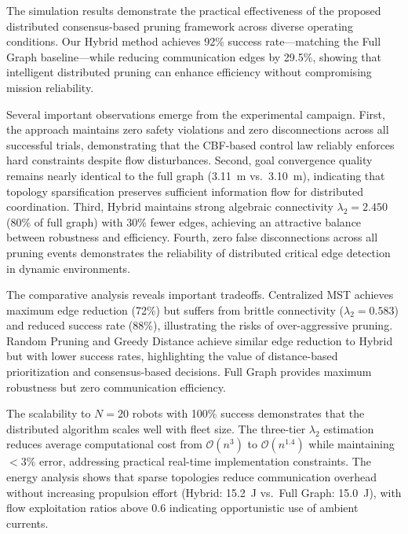 The simulation results demonstrate the practical effectiveness of the proposed distributed consensus-based pruning framework across diverse operating conditions. Our Hybrid method achieves 92\% success rate---matching the Full Graph baseline---while reducing communication edges by 29.5\%, showing that intelligent distributed pruning can enhance efficiency without compromising mission reliability.

Several important observations emerge from the experimental campaign. First, the approach maintains zero safety violations and zero disconnections across all successful trials, demonstrating that the CBF-based control law reliably enforces hard constraints despite flow disturbances. Second, goal convergence quality remains nearly identical to the full graph (3.11~m vs.\ 3.10~m), indicating that topology sparsification preserves sufficient information flow for distributed coordination. Third, Hybrid maintains strong algebraic connectivity $\lambda_2 = 2.450$ (80\% of full graph) with 30\% fewer edges, achieving an attractive balance between robustness and efficiency. Fourth, zero false disconnections across all pruning events demonstrates the reliability of distributed critical edge detection in dynamic environments.

The comparative analysis reveals important tradeoffs. Centralized MST achieves maximum edge reduction (72\%) but suffers from brittle connectivity ($\lambda_2 = 0.583$) and reduced success rate (88\%), illustrating the risks of over-aggressive pruning. Random Pruning and Greedy Distance achieve similar edge reduction to Hybrid but with lower success rates, highlighting the value of distance-based prioritization and consensus-based decisions. Full Graph provides maximum robustness but zero communication efficiency.

The scalability to $N=20$ robots with 100\% success demonstrates that the distributed algorithm scales well with fleet size. The three-tier $\lambda_2$ estimation reduces average computational cost from $\mathcal{O}(n^3)$ to $\mathcal{O}(n^{1.4})$ while maintaining $<3\%$ error, addressing practical real-time implementation constraints. The energy analysis shows that sparse topologies reduce communication overhead without increasing propulsion effort (Hybrid: 15.2~J vs.\ Full Graph: 15.0~J), with flow exploitation ratios above 0.6 indicating opportunistic use of ambient currents.

